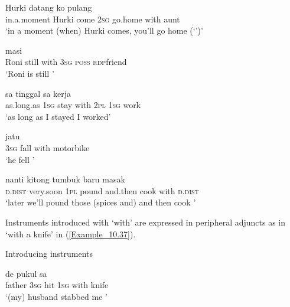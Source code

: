 \ea
\label{Example_10.32}
 {Hurki} {datang} {ko} {pulang} {} {}\\ %
 in.a.moment  Hurki  come  \textsc{2sg}  go.home  with  aunt\\
\glt 
‘in a moment (when) Hurki comes, you’ll go home  (‘’)’ \textstyleExampleSource{[081011-006-Cv.0003]}
\z

\ea
\label{Example_10.33}
 {masi} {} {} {} {}\\ %
 Roni  still  with  \textsc{3sg}  \textsc{poss}  \textsc{rdp}{\Tilde}friend\\
\glt 
‘Roni is still ’ \textstyleExampleSource{[081006-031-Cv.0011]}
\z

\ea
\label{Example_10.34}
 {sa} {tinggal} {} {} {sa} {kerja}\\ %
 as.long.as  \textsc{1sg}  stay  with  \textsc{2pl}  \textsc{1sg}  work\\
\glt 
‘as long as I stayed  I worked’ \textstyleExampleSource{[080919-006-CvNP.0014]}
\z

\ea
\label{Example_10.35}
 {jatu} {} {}\\ %
 \textsc{3sg}  fall  with  motorbike\\
\glt 
‘he fell ’ \textstyleExampleSource{[081006-020-Cv.0008]}
\z

\ea
\label{Example_10.36}
 {nanti} {kitong} {tumbuk} {baru} {masak} {} {}\\ %
 \textsc{d.dist}  very.soon  \textsc{1pl}  pound  and.then  cook  with  \textsc{d.dist}\\
\glt 
‘later we’ll pound those (spices and) and then cook ’ \textstyleExampleSource{[081010-001-Cv.0196]}
\z


Instruments introduced with   ‘with’ are expressed in peripheral adjuncts as in  ‘with a knife’ in (\ref{Example_10.37}).


\begin{styleExampleTitle}
Introducing instruments
\end{styleExampleTitle}

\ea
\label{Example_10.37}
 {de} {pukul} {sa} {} {}\\ %
 father  \textsc{3sg}  hit  \textsc{1sg}  with  knife\\
\glt 
‘(my) husband stabbed me ’ \textstyleExampleSource{[081011-023-Cv.0167]}
\z


